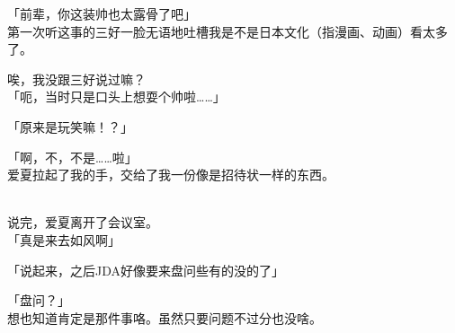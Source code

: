 「前辈，你这装帅也太露骨了吧」\\

第一次听这事的三好一脸无语地吐槽我是不是日本文化（指漫画、动画）看太多了。

唉，我没跟三好说过嘛？\\

「呃，当时只是口头上想耍个帅啦……」

「原来是玩笑嘛！？」

「啊，不，不是……啦」\\

爱夏拉起了我的手，交给了我一份像是招待状一样的东西。\\



\\

说完，爱夏离开了会议室。\\

「真是来去如风啊」

「说起来，之后JDA好像要来盘问些有的没的了」

「盘问？」\\

想也知道肯定是那件事咯。虽然只要问题不过分也没啥。\\

